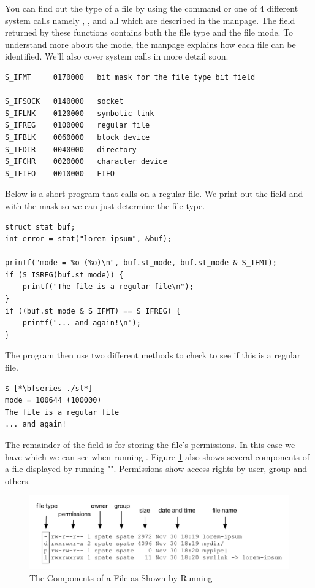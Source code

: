 \noindent
You can find out the type of a file by using the  command or one of 4 different system calls namely , ,  and  all which are described in the  manpage. The  field returned by these functions contains both the file type and the file mode. To understand more about the mode, the  manpage explains how each file can be identified. We'll also cover system calls in more detail soon.

\begin{lstlisting}
S_IFMT     0170000   bit mask for the file type bit field

S_IFSOCK   0140000   socket
S_IFLNK    0120000   symbolic link
S_IFREG    0100000   regular file
S_IFBLK    0060000   block device
S_IFDIR    0040000   directory
S_IFCHR    0020000   character device
S_IFIFO    0010000   FIFO
\end{lstlisting}

\noindent
Below is a short program that calls  on a regular file. We print out the  field and with the mask so we can just determine the file type.

\begin{lstlisting}
struct stat buf;
int error = stat("lorem-ipsum", &buf);

printf("mode = %o (%o)\n", buf.st_mode, buf.st_mode & S_IFMT);
if (S_ISREG(buf.st_mode)) {
	printf("The file is a regular file\n");
}
if ((buf.st_mode & S_IFMT) == S_IFREG) {
	printf("... and again!\n");
}
\end{lstlisting}

\noindent
The program then use two different methods to check to see if this is a regular file.

\begin{lstlisting}
$ [*\bfseries ./st*]
mode = 100644 (100000)
The file is a regular file
... and again!
\end{lstlisting}

\noindent
The remainder of the  field is for storing the file's permissions. In this case we have  which we can see when running . Figure \ref{fig:ls-l} also shows several components of a file displayed by running "". Permissions show access rights by user, group and others.

\begin{figure}[h]
	\includegraphics[scale=0.6]{figures/ls-l.pdf}
	\centering
	\caption{The Components of a File as Shown by Running }
	\label{fig:ls-l}
\end{figure}


